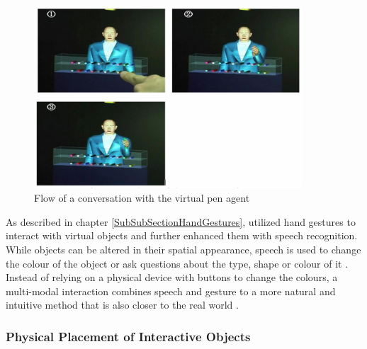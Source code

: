 \begin{figure}[h]
	\begin{center}
		\includegraphics[width=10cm]{03_Figures/05_LitReview/Uchino2008_SpeechPointing.png}
		\caption[Flow of a conversation with the virtual pen agent]{Flow of a conversation with the virtual pen agent \citep{Uchino2008}}
		\label{fig:speechrecignitionpen}
	\end{center}
\end{figure}
\newline
As described in chapter \ref{SubSubSectionHandGestures}, \cite{Chun2015} utilized hand gestures to interact with virtual objects and further enhanced them with speech recognition. While objects can be altered in their spatial appearance, speech is used to change the colour of the object or ask questions about the type, shape or colour of it \citep{Chun2015}. Instead of relying on a physical device with buttons to change the colours, a multi-modal interaction combines speech and gesture to a more natural and intuitive method that is also closer to the real world \citep{Chun2015} .


\subsubsection{Physical Placement of Interactive Objects}

